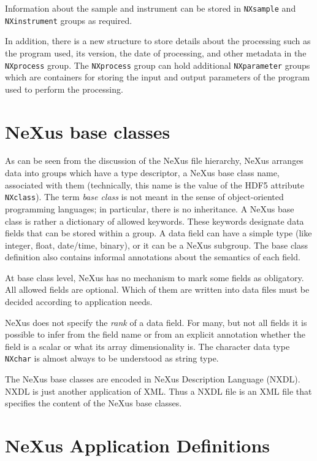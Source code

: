 \documentclass[%
 aip,
rsi,
 amsmath,amssymb,
 reprint,%
]{revtex4-1}
\begin{document}
Information about the sample and instrument can be stored in \texttt{NXsample} and \texttt{NXinstrument} groups as required. 

In addition, there is a new structure to store details about the processing such as the program used, its version, 
the date of processing, and other metadata 
in the \texttt{NXprocess} group. The \texttt{NXprocess} group can hold additional \texttt{NXparameter} groups which are containers 
for storing the input and output parameters of the program used to perform the processing. 


\section{NeXus base classes}

As can be seen from the discussion of the NeXus file hierarchy, NeXus arranges data into groups which have a 
type descriptor, a NeXus base class name, associated with them
(technically, this name is the value of the HDF5 attribute \texttt{NXclass}).
The term \emph{base class} is not meant in the sense of 
object-oriented programming languages;
in particular, there is no inheritance.
A NeXus base class is rather a dictionary of allowed keywords.
These keywords designate data fields that can be stored within a group.
A data field can have a simple type (like integer, float, date/time, binary),
or it can be a NeXus subgroup.
The base class definition also contains informal annotations
about the semantics of each field.

At base class level, NeXus has no mechanism to mark some fields as obligatory.
All allowed fields are optional.
Which of them are written into data files must be decided
according to application needs.

NeXus does not specify the \emph{rank} of a data field.
For many, but not all fields it is possible to infer from
the field name or from an explicit annotation
whether the field is a scalar or what its array dimensionality is.
The character data type \texttt{NXchar} is almost always to be
understood as string type.

The NeXus base classes are encoded in NeXus Description Language (NXDL)\cite{nxman}. NXDL is 
just another application of XML. Thus a NXDL file is an XML file that specifies the content of the NeXus base classes. 


\section{NeXus Application Definitions}
  \label{sect_appdef}
\end{document}
